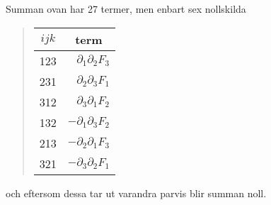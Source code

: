 \documentclass[%
oneside,                 %
final,                   %
10pt]{article}
\begin{document}
\noindent
Summan ovan har 27 termer, men enbart sex nollskilda

\begin{quote}
\begin{tabular}{cr}
\hline
\multicolumn{1}{c}{ $ijk$ } & \multicolumn{1}{c}{ term } \\
\hline
123   & $\partial_1 \partial_2 F_3$  \\
231   & $\partial_2 \partial_3 F_1$  \\
312   & $\partial_3 \partial_1 F_2$  \\
132   & $-\partial_1 \partial_3 F_2$ \\
213   & $-\partial_2 \partial_1 F_3$ \\
321   & $-\partial_3 \partial_2 F_1$ \\
\hline
\end{tabular}
\end{quote}

\noindent
och eftersom dessa tar ut varandra parvis blir summan noll.




\printindex
\end{document}
